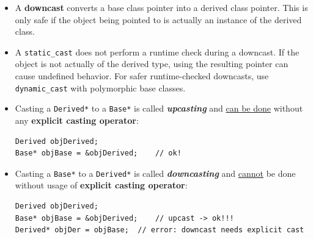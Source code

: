 \documentclass[10pt]{article}
\newcommand{\pbreak}{\vspace{30pt}}
\begin{document}
\begin{itemize}
\begin{itemize}
    \item A \textbf{downcast} converts a base class pointer into a derived class pointer. This is only safe if the object being pointed to is actually an instance of the derived class.

    \item A \verb|static_cast| does not perform a runtime check during a downcast. If the object is not actually of the derived type, using the resulting pointer can cause undefined behavior. For safer runtime-checked downcasts, use \verb|dynamic_cast| with polymorphic base classes.
\end{itemize}
\end{itemize}

\pbreak

\begin{tcolorbox}
	\begin{itemize}
		\item Casting a \verb|Derived*| to a \verb|Base*| is called \textbf{\textit{upcasting}} and \underline{can be done} without any \textbf{explicit casting operator}:

			\begin{verbatim}
Derived objDerived;
Base* objBase = &objDerived;	// ok!
			\end{verbatim}

		\item Casting a \verb|Base*| to a \verb|Derived*| is called \textbf{\textit{downcasting}} and \underline{cannot} be done without usage of \textbf{explicit casting operator}:

	\begin{verbatim}
Derived objDerived;
Base* objBase = &objDerived;	// upcast -> ok!!!
Derived* objDer = objBase;	// error: downcast needs explicit cast
	\end{verbatim}


	\end{itemize}
\end{tcolorbox}

\pbreak
\end{document}
